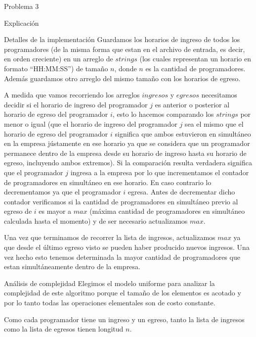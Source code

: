\begin{section}{Problema 3}
\begin{subsection}{Explicación}
	\end{subsection}

	\begin{subsection}{Detalles de la implementación}
	Guardamos los horarios de ingreso de todos los programadores (de la misma forma que estan en el archivo de entrada, es decir, en orden creciente) en un arreglo de $strings$ (los cuales representan un horario en formato ``HH:MM:SS'') de tamaño $n$, donde $n$ es la cantidad de programadores. Además guardamos otro arreglo del mismo tamaño con los horarios de egreso.
	
	A medida que vamos recorriendo los arreglos $ingresos$ y $egresos$ necesitamos decidir si el horario de ingreso del programador $j$ es anterior o posterior al horario de egreso del programador $i$, esto lo hacemos comparando los $strings$ por menor o igual (que el horario de ingreso del programador $j$ sea el mismo que el horario de egreso del programador $i$ significa que ambos estuvieron en simultáneo en la empresa jústamente en ese horario ya que se considera que un programador permanece dentro de la empresa desde su horario de ingreso hasta su horario de egreso, incluyendo ambos extremos). Si la comparación resulta verdadera significa que el programador $j$ ingresa a la empresa por lo que incrementamos el contador de programadores en simultáneo en ese horario. En caso contrario lo decrementamos ya que el programador $i$ egresa. Antes de decrementar dicho contador verificamos si la cantidad de programadores en simultáneo previo al egreso de $i$ es mayor a $max$ (máxima cantidad de programadores en simultáneo calculada hasta el momento) y de ser necesario actualizamos $max$.

	Una vez que terminamos de recorrer la lista de ingresos, actualizamos $max$ ya que desde el último egreso visto se pueden haber producido nuevos ingresos. Una vez hecho esto tenemos determinada la mayor cantidad de programadores que estan simultáneamente dentro de la empresa.
	\end{subsection}

	\begin{subsection}{Análisis de complejidad}
			Elegimos el modelo uniforme para analizar la complejidad de este algoritmo porque el tamaño de los elementos es acotado y por lo tanto todas las operaciones elementales son de costo constante.\Pa
			
			Como cada programador tiene un ingreso y un egreso, tanto la lista de ingresos como la lista de egresos tienen longitud $n$.


\end{subsection}
\end{section}
